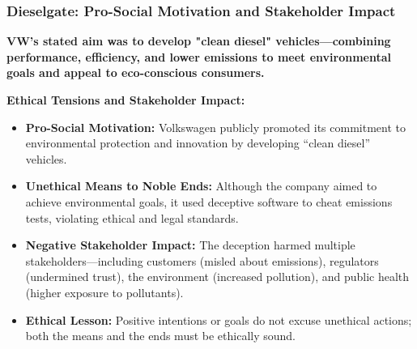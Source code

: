 \documentclass[aspectratio=169, 10pt]{beamer}
\begin{document}
\begin{frame}
\frametitle{Dieselgate: Pro-Social Motivation and Stakeholder Impact}

\begin{tcolorbox}[colback=WHUblue!5!white, colframe=WHUblue, title=Environmental Goals and Ethical Tensions, fonttitle=\bfseries, sharp corners=south]
\textbf{VW's stated aim was to develop "clean diesel" vehicles—combining performance, efficiency, and lower emissions to meet environmental goals and appeal to eco-conscious consumers.}
\end{tcolorbox}

\vspace{1em}

\textbf{Ethical Tensions and Stakeholder Impact:}
\begin{itemize}
  \item \textbf{Pro-Social Motivation:} Volkswagen publicly promoted its commitment to environmental protection and innovation by developing “clean diesel” vehicles.
  \item \textbf{Unethical Means to Noble Ends:} Although the company aimed to achieve environmental goals, it used deceptive software to cheat emissions tests, violating ethical and legal standards.
  \item \textbf{Negative Stakeholder Impact:} The deception harmed multiple stakeholders—including customers (misled about emissions), regulators (undermined trust), the environment (increased pollution), and public health (higher exposure to pollutants).
  \item \textbf{Ethical Lesson:} Positive intentions or goals do not excuse unethical actions; both the means and the ends must be ethically sound.
\end{itemize}

\end{frame}
\end{document}

